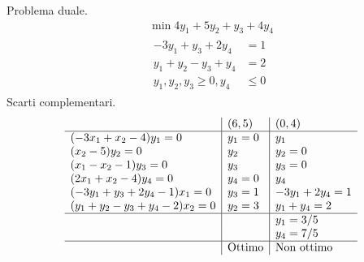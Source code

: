 Problema duale.
\begin{gather*}
\min 4y_{1} +5y_{2} +y_{3} +4y_{4}\\
\begin{aligned}
-3y_{1} +y_{3} +2y_{4} & =1\\
y_{1} +y_{2} -y_{3} +y_{4} & =2\\
y_{1} ,y_{2} ,y_{3} \geq 0,y_{4} & \leq 0
\end{aligned}
\end{gather*}
Scarti complementari.
\begin{equation*}
\begin{array}{ l|l|l }
 & ( 6,5) & ( 0,4)\\
\hline
( -3x_{1} +x_{2} -4) y_{1} =0 & y_{1} =0 & y_{1}\\
( x_{2} -5) y_{2} =0 & y_{2} & y_{2} =0\\
( x_{1} -x_{2} -1) y_{3} =0 & y_{3} & y_{3} =0\\
( 2x_{1} +x_{2} -4) y_{4} =0 & y_{4} =0 & y_{4}\\
( -3y_{1} +y_{3} +2y_{4} -1) x_{1} =0 & y_{3} =1 & -3y_{1} +2y_{4} =1\\
( y_{1} +y_{2} -y_{3} +y_{4} -2) x_{2} =0 & y_{2} =3 & y_{1} +y_{4} =2\\
\hline
 &  & y_{1} =3/5\\
 &  & y_{4} =7/5\\
\hline
 & \text{Ottimo} & \text{Non ottimo}
\end{array}
\end{equation*}
